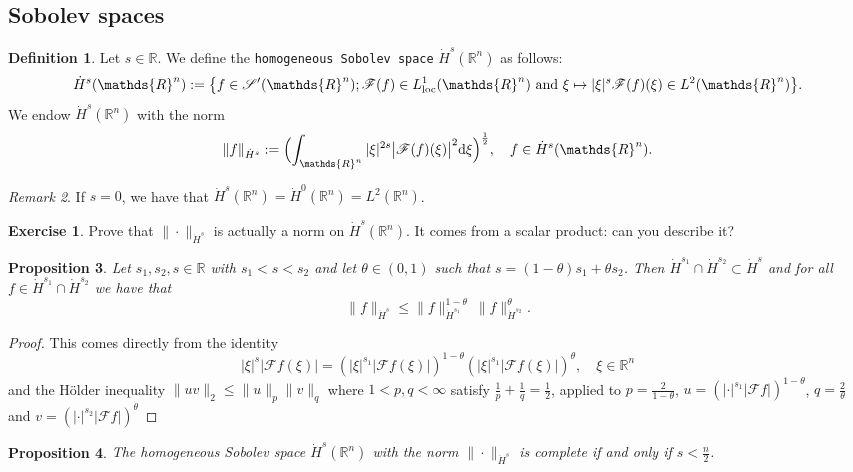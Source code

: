\documentclass[a4paper, 12pt]{article}
\theoremstyle{plain}
\newtheorem{proposition}{Proposition}[section]
\theoremstyle{definition}
\newtheorem{definition}[proposition]{Definition}
\newtheorem{exercise}{Exercise}
\theoremstyle{remark}
\newtheorem{remark}[proposition]{Remark}
\numberwithin{equation}{section}
\begin{document}
\subsection{Sobolev spaces}

\begin{definition}
Let $s\in{\mathds{R}}$.
We define the {\tt homogeneous Sobolev space} $\dot H^s({\mathds{R}}^n)$ as follows:
\[
\dot H^s({\mathds{R}}^n):=\bigl\{f\in{\mathscr{S}}'({\mathds{R}}^n); {\mathscr{F}}(f)\in L^1_{\rm loc}({\mathds{R}}^n)\mbox{ and }
\xi\mapsto |\xi|^s{\mathscr{F}}(f)(\xi) \in L^2({\mathds{R}}^n)\bigr\}.
\]
We endow $\dot H^s({\mathds{R}}^n)$ with the norm
\[
\|f\|_{\dot H^s}:=\Bigl(\int_{{\mathds{R}}^n} |\xi|^{2s}\bigl|{\mathscr{F}}(f)(\xi)\bigr|^2{\rm d}\xi\Bigr)^{\frac{1}{2}},
\quad f\in \dot H^s({\mathds{R}}^n).
\]
\end{definition}

\begin{remark}
If $s=0$, we have that $\dot H^s({\mathds{R}}^n)=\dot H^0({\mathds{R}}^n)=L^2({\mathds{R}}^n)$.
\end{remark}

\begin{exercise}
Prove that $\|\cdot\|_{\dot H^s}$ is actually a norm on $\dot H^s({\mathds{R}}^n)$. It comes from a scalar product: can you describe it?
\end{exercise}

\begin{proposition}
Let $s_1,s_2,s\in{\mathds{R}}$ with $s_1<s<s_2$ and let $\theta\in (0,1)$ such that $s=(1-\theta) s_1+\theta s_2$.
Then $\dot H^{s_1}\cap \dot H^{s_2}\subset \dot H^s$ and for all $f\in \dot H^{s_1}\cap \dot H^{s_2}$ we have that
\[
\|f\|_{\dot H^s}\le \|f\|_{\dot H^{s_1}}^{1-\theta}\ \|f\|_{\dot H^{s_2}}^\theta.
\]
\end{proposition}

\begin{proof}
This comes directly from the identity
\[
|\xi|^s|{\mathscr{F}}f(\xi)| = (|\xi|^{s_1}|{\mathscr{F}}f(\xi)|)^{1-\theta}  (|\xi|^{s_1}|{\mathscr{F}}f(\xi)|)^\theta, \quad \xi\in {\mathds{R}}^n
\]
and the H\"older inequality $\|uv\|_2\le \|u\|_p\|v\|_q$ where $1<p,q<\infty$ satisfy $\frac{1}{p}+\frac{1}{q}=\frac{1}{2}$, 
applied to $p=\frac{2}{1-\theta}$,
$u=(|\cdot|^{s_1}|{\mathscr{F}}f|)^{1-\theta}$, $q=\frac{2}{\theta}$ and $v=(|\cdot|^{s_2}|{\mathscr{F}}f|)^{\theta}$
\end{proof}

\begin{proposition}
The homogeneous Sobolev space $\dot H^s({\mathds{R}}^n)$ with the norm $\|\cdot\|_{\dot H^s}$ is complete if and only if $s<\frac{n}{2}$.
\end{proposition}
\end{document}
